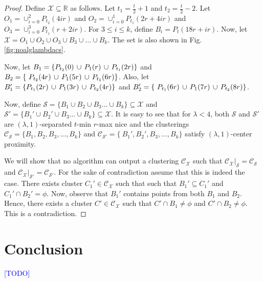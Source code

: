 \documentclass[anon,12pt]{colt2016} %
\newcommand{\mc}{\mathcal}
\newcommand{\todo}{\textcolor{blue}{[TODO]}\xspace}
\begin{document}
\begin{proof}
Define $\mc X \subseteq \mathbb{R}$ as follows. Let $t_1 = \frac{t}{2}+1$ and $t_2 = \frac{t}{2}-2$. Let $O_1 = \cup_{i=0}^2 P_{t_2}(4ir)$ and $O_2 = \cup_{i=0}^1 P_{t_1}(2r+4ir)$ and $O_3 = \cup_{i=0}^3 P_{t_1}(r+2ir)$. For $3\le i\le k$, define $B_i = P_t(18r+ir)$. Now, let $\mc X = O_1 \cup O_2 \cup O_3 \cup B_3 \cup \ldots \cup B_k$. The set is also shown in Fig. \ref{fig:noalglambdacs}.

Now, let $B_1 = \{P_{t_2}(0) \thinspace\cup\thinspace  P_{1}(r) \thinspace\cup\thinspace P_{t_1}(2r) \}$ and $B_2 = \{\ P_{t_2}(4r) \thinspace\cup\thinspace P_{1}(5r)\thinspace\cup\thinspace P_{t_1}(6r)\}$. Also, let $B_1' = \{P_{t_1}(2r) \thinspace\cup\thinspace  P_{1}(3r) \thinspace\cup\thinspace P_{t_2}(4r) \}$ and $B_2' = \{\ P_{t_1}(6r) \thinspace\cup\thinspace P_{1}(7r)\thinspace\cup\thinspace P_{t_2}(8r)\}$.

Now, define $\mc S = \{B_1 \cup B_2 \cup B_3\ldots \cup B_k\} \subseteq \mc X$ and $\mc S' = \{B_1' \cup B_2' \cup B_3\ldots \cup B_k\} \subseteq \mc X$. It is easy to see that for $\lambda < 4$, both $\mc S$ and $\mc S'$ are $(\lambda, 1)$-separated $t$-min $r$-max nice and the clusterings $\mc C_{\mc S} = \{B_1, B_2, B_3, \ldots, B_k\}$ and $\mc C_{\mc S'} = \{\ B_1', B_2', B_3, \ldots, B_k\}$ satisfy $(\lambda, 1)$-center proximity. 

We will show that no algorithm can output a clustering $\mc C_{\mc X}$ such that $\mc C_{\mc X}|_{\mc S} = \mc C_{\mc S}$ and $\mc C_{\mc X}|_{\mc S'} = \mc C_{\mc S'}$. For the sake of contradiction assume that this is indeed the case. There exists cluster $C_1' \in \mc C_{\mc X}$ such that such that $B_1' \subseteq C_1'$ and $C_1' \cap B_2' = \phi$. Now, observe that $B_1'$ contains points from both $B_1$ and $B_2$. Hence, there exists a cluster $C' \in \mc C_{\mc X}$ such that $C' \cap B_1 \neq \phi$ and $C' \cap B_2 \neq \phi$. This is a contradiction.
\end{proof}

\section{Conclusion}
\todo


 
\end{document}
